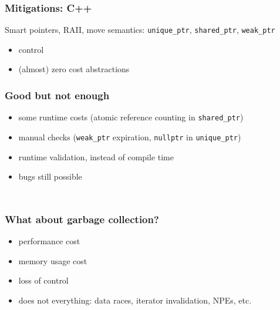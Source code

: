 \documentclass{beamer}
\begin{document}
\begin{frame}
    \inputminted[fontsize=\scriptsize]{c}{code/vec3.c}
\end{frame}

\begin{frame}
    \frametitle{Mitigations: C++}
    Smart pointers, RAII, move semantics: \texttt{unique\_ptr}, \texttt{shared\_ptr}, \texttt{weak\_ptr}
    \begin{itemize}
        \item control %
        \item (almost) zero cost abstractions
    \end{itemize}
\end{frame}

\begin{frame}
    \frametitle{Good but not enough}
    \begin{itemize}
        \item some runtime costs (atomic reference counting in \texttt{shared\_ptr})
        \item manual checks (\texttt{weak\_ptr} expiration, \texttt{nullptr} in \texttt{unique\_ptr})
        \item runtime validation, instead of compile time
        \item bugs still possible
    \end{itemize}
\end{frame}

\begin{frame}
    \inputminted{c++}{code/bad_move.cpp}
\end{frame}

\begin{frame}
    \inputminted{c++}{code/invalid_ref.cpp}
\end{frame}


\begin{frame}
    \frametitle{What about garbage collection?}
    \begin{itemize}
        \item performance cost
        \item memory usage cost
        \item loss of control
        \item does not everything: data races, iterator invalidation, NPEs, etc.
    \end{itemize}
\end{frame}
\end{document}
